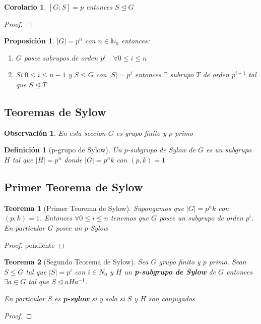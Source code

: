 \documentclass[10pt]{extarticle}
\theoremstyle{break}
\newtheorem{theorem}{Teorema}[section]
\newtheorem{corollary}{Corolario}[theorem]
\newtheorem{proposition}{Proposición}
\newtheorem*{remark}{Observación}
\newtheorem{definition}{Definición}[section]
\theoremstyle{definition}
\begin{document}
\begin{corollary}
	$ [G:S]=p $ entonces $ S \trianglelefteq G $
\end{corollary}
\begin{proof}
	
\end{proof}

\begin{proposition}
	$ |G|=p^{n} $ con $ n\in \mathbb{N}_{0} $ entonces:
	\begin{enumerate}
		\item  $ G $ posee subrupos de orden $ p^{i} \quad \forall 0\leq i\leq n$
		\item Si $0\leq i\leq n-1$ y $S\leq G$ con $|S|=p^{i}$ entonces $\exists $ subrupo $T$ de orden $p^{i+1}$ tal que $S \trianglelefteq T$ 
	\end{enumerate}
\end{proposition}

\subsection{Teoremas de Sylow}

\begin{remark}
	En esta seccion $G$ es grupo finito y $p$ primo
\end{remark}

\begin{definition}[p-grupo de Sylow]
	Un $p$-subgrupo de Sylow de $G$ es un subgrupo $H$  tal que $\lvert H \rvert =p^{n}$ donde $\lvert G \rvert =p^{n}k$ con $(p,k)=1$ 
\end{definition}

\subsection{Primer Teorema de Sylow}
\begin{theorem}[Primer Teorema de Sylow] \label{14.1}
	Supongamos que $\lvert G \rvert =p^{n}k$ con $(p,k)=1$. Entonces $\forall 0\leq i\leq n$ tenemos que $G$ posee un subgrupo de orden $p^{i}$. En particular $G$ posee un $p$-Sylow 
\end{theorem}
\begin{proof}
	pendiente  
\end{proof}

\begin{theorem}[Segundo Teorema de Sylow]\label{14.2}
	Sea $G$ grupo finito y $p$ primo. Sean $S\leq  G$ tal que $\lvert S \rvert =p^{i}$ con $i\in N_{0}$ y $H$ un \textbf{p-subgrupo de Sylow} de $G$ entonces $\exists a\in G$ tal que $S\trianglelefteq aHa^{-1}$. 

	En particular $S$ es \textbf{p-sylow} si y solo si $S$ y $H$ son conjugados 
\end{theorem}
\begin{proof}
	
\end{proof}
\end{document}
